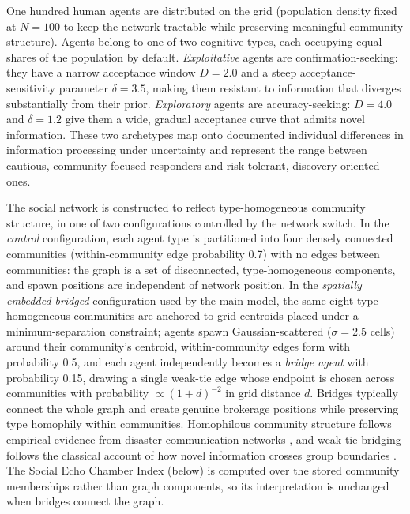 \documentclass[pdflatex,sn-basic]{sn-jnl}
\begin{document}
One hundred human agents are distributed on the grid (population density fixed at $N = 100$ to keep the network tractable while preserving meaningful community structure). Agents belong to one of two cognitive types, each occupying equal shares of the population by default. \emph{Exploitative} agents are confirmation-seeking: they have a narrow acceptance window $D = 2.0$ and a steep acceptance-sensitivity parameter $\delta = 3.5$, making them resistant to information that diverges substantially from their prior. \emph{Exploratory} agents are accuracy-seeking: $D = 4.0$ and $\delta = 1.2$ give them a wide, gradual acceptance curve that admits novel information. These two archetypes map onto documented individual differences in information processing under uncertainty \citep{hertwig2016homo,march1991exploration}
and represent the range between cautious, community-focused responders and risk-tolerant, discovery-oriented ones.

The social network is constructed to reflect type-homogeneous community structure, in one of two configurations controlled by the network switch. In the \emph{control} configuration, each agent type is partitioned into four densely connected communities (within-community edge probability 0.7) with no edges between communities: the graph is a set of disconnected, type-homogeneous components, and spawn positions are independent of network position. In the \emph{spatially embedded bridged} configuration used by the main model, the same eight type-homogeneous communities are anchored to grid centroids placed under a minimum-separation constraint; agents spawn Gaussian-scattered ($\sigma = 2.5$ cells) around their community's centroid, within-community edges form with probability 0.5, and each agent independently becomes a \emph{bridge agent} with probability 0.15, drawing a single weak-tie edge whose endpoint is chosen across communities with probability $\propto (1 + d)^{-2}$ in grid distance $d$. Bridges typically connect the whole graph and create genuine brokerage positions while preserving type homophily within communities. Homophilous community structure follows empirical evidence from disaster communication networks \citep{bruns2012qldfloods,sutton2008backchannels},
and weak-tie bridging follows the classical account of how novel information crosses group boundaries \citep{granovetter1973strength}. The Social Echo Chamber Index (below) is computed over the stored community memberships rather than graph components, so its interpretation is unchanged when bridges connect the graph.
\end{document}
